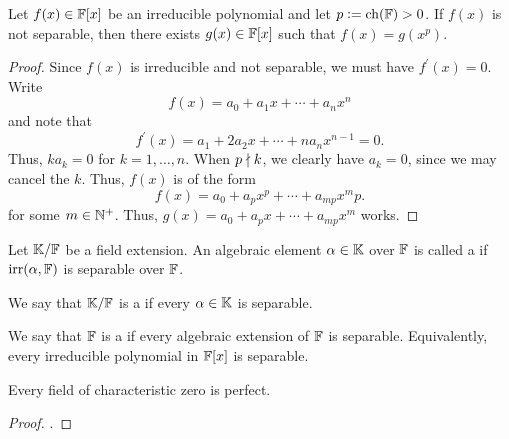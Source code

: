 \begin{prop} \label{prop:poly-p-power-not-sep}
    Let $f(x) \in \mathbb{F}[x]$ be an irreducible polynomial and let $p \vcentcolon= \operatorname{ch}(\mathbb{F}) > 0$. If $f(x)$ is not separable, then there exists $g(x) \in \mathbb{F}[x]$ such that $f(x) = g(x^p)$.
\end{prop}
\begin{proof}
    Since $f(x)$ is irreducible and not separable, we must have $f^{\prime}(x) = 0$. Write
    \[
        f(x) = a_0 + a_1x + \cdots + a_n x^n
    \]
    and note that
    \[
        f^{\prime}(x) = a_1 + 2a_2 x + \cdots + na_nx^{n-1} = 0.
    \]
    Thus, $ka_k = 0$ for $k=1,\ldots,n$. When $p \nmid k$, we clearly have $a_k = 0$, since we may cancel the $k$. Thus, $f(x)$ is of the form
    \[
        f(x) = a_0 + a_p x^p + \cdots + a_{mp} x^mp.
    \]
    for some $m \in \mathbb{N}^+$. Thus, $g(x) = a_0 + a_p x + \cdots + a_{mp} x^m$ works.
\end{proof}

\begin{defn}
    Let $\mathbb{K}/\mathbb{F}$ be a field extension. An algebraic element $\alpha \in \mathbb{K}$ over $\mathbb{F}$ is called a  if $\operatorname{irr}(\alpha, \mathbb{F})$ is separable over $\mathbb{F}$.
    
    We say that $\mathbb{K}/\mathbb{F}$ is a  if every $\alpha \in \mathbb{K}$ is separable. 
    
    We say that $\mathbb{F}$ is a  if every algebraic extension of $\mathbb{F}$ is separable. Equivalently, every irreducible polynomial in $\mathbb{F}[x]$ is separable.
\end{defn}

\begin{cor}\label{cor:zero-char-perfect}
    Every field of characteristic zero is perfect.
\end{cor}
\begin{proof}
    .
\end{proof}

